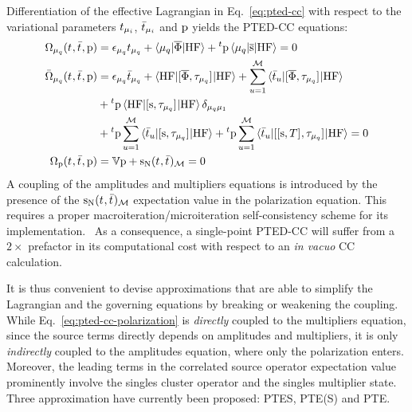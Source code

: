 Differentiation of the effective Lagrangian in Eq.~\eqref{eq:pted-cc}
with respect to the variational parameters $t_{\mu_i}$,
$\bar{t}_{\mu_i}$ and $\mathrm{p}$ yields the \acrshort{PTED}-\acrshort{CC}
equations:
\begin{subequations}\label{eq:pted}
  \begin{align}
   \Omega_{\mu_q}(t_{}, \bar{t}_{}, \mathrm{p})  &=
   \epsilon_{\mu_q}t_{\mu_q} + \braket{\mu_q | \overline{\Phi} | \mathrm{HF}}
   + {}^t\mathrm{p}\braket{\mu_q | \overline{\mathrm{s}} | \mathrm{HF}}
             = 0 \label{eq:pted-cc-amplitudes}\\
   \bar{\Omega}_{\mu_q}(t_{}, \bar{t}_{}, \mathrm{p})
    &=
    \epsilon_{\mu_q}\bar{t}_{\mu_q} +
    \braket{\mathrm{HF} | [ \overline{\Phi}, \tau_{\mu_q} ]^{} | \mathrm{HF}} +
    \sum_{u=1}^{\mathcal{M}}\braket{\bar{t}_{u} |
    [ \overline{\Phi}, \tau_{\mu_q} ]^{} | \mathrm{HF}}
    \nonumber \\
    &+
    {}^t\mathrm{p}\braket{\mathrm{HF} | [ \mathrm{s}, \tau_{\mu_q} ]^{} | \mathrm{HF}}\delta_{\mu_q\mu_1} \nonumber \\
    &+
    {}^t\mathrm{p}\sum_{u=1}^{\mathcal{M}}\braket{\bar{t}_{u} | [ \mathrm{s}, \tau_{\mu_q} ]^{} | \mathrm{HF}}
    +
    {}^t\mathrm{p}\sum_{u=1}^{\mathcal{M}}\braket{\bar{t}_{u} | [ [ \mathrm{s}, T ]^{}, \tau_{\mu_q} ]^{} | \mathrm{HF}}
             = 0 \label{eq:pted-cc-multipliers}\\
    \Omega_{\mathrm{p}}(t_{}, \bar{t}_{}, \mathrm{p})
    &=
    \mathbb{V}\mathrm{p} + \mathrm{s}_{\mathrm{N}}(t_{}, \bar{t}_{})_\mathcal{M} = 0
    \label{eq:pted-cc-polarization}
  \end{align}
\end{subequations}
A coupling of the amplitudes and multipliers equations is introduced by
the presence of the $\mathrm{s}_{\mathrm{N}}(t_{}, \bar{t}_{})_\mathcal{M}$ expectation value
in the polarization equation.
This requires a proper macroiteration/microiteration self-consistency
scheme for its implementation.~\autocite{Cammi2009-gu, Caricato2010-hx}
As a consequence, a single-point \acrshort{PTED}-\acrshort{CC} will suffer from a
$2\times$ prefactor in its computational cost with respect to an
\emph{in vacuo} \acrshort{CC} calculation.

It is thus convenient to devise approximations that are able to simplify the
Lagrangian and the governing equations by breaking or weakening the coupling.
While Eq.~\eqref{eq:pted-cc-polarization} is \emph{directly} coupled to
the multipliers equation, since the source terms directly depends on
amplitudes and multipliers, it is only \emph{indirectly} coupled to the
amplitudes equation, where only the polarization enters.
Moreover, the leading terms in the correlated source operator
expectation value prominently involve the
singles cluster operator and the singles multiplier state.
Three approximation have currently been proposed: \gls{PTES}, \gls{PTE(S)}
and \gls{PTE}.

